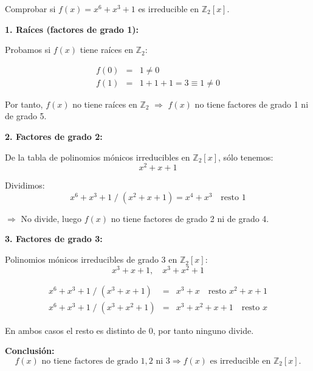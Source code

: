\documentclass[a4paper,12pt]{article}
\begin{document}
\begin{ejemplo}[title=Ejemplo: Polinomio Irreducible]

Comprobar si \( f(x) = x^6 + x^3 + 1 \) es irreducible en \(\mathbb{Z}_2[x]\).

\medskip
\textbf{1. Raíces (factores de grado 1):}

Probamos si \(f(x)\) tiene raíces en \(\mathbb{Z}_2\):

\[
\begin{array}{lcl}
f(0) &=& 1 \neq 0 \\
f(1) &=& 1 + 1 + 1 = 3 \equiv 1 \neq 0
\end{array}
\]

Por tanto, \(f(x)\) no tiene raíces en \(\mathbb{Z}_2\)  
\(\Rightarrow\) \(f(x)\) no tiene factores de grado 1 ni de grado 5.

\medskip
\textbf{2. Factores de grado 2:}

De la tabla de polinomios mónicos irreducibles en \(\mathbb{Z}_2[x]\), sólo tenemos:
\[
x^2 + x + 1
\]

Dividimos:
\[
x^6 + x^3 + 1 \; / \; (x^2 + x + 1) = x^4 + x^3 \quad \text{resto } \boxed{1}
\]

\(\Rightarrow\) No divide, luego \(f(x)\) no tiene factores de grado 2 ni de grado 4.

\medskip
\textbf{3. Factores de grado 3:}

Polinomios mónicos irreducibles de grado 3 en \(\mathbb{Z}_2[x]\):
\[
x^3 + x + 1, \quad x^3 + x^2 + 1
\]

\[
\begin{array}{lcl}
x^6 + x^3 + 1 \; / \; (x^3 + x + 1) &=& x^3 + x \quad \text{resto } x^2 + x + 1 \\
x^6 + x^3 + 1 \; / \; (x^3 + x^2 + 1) &=& x^3 + x^2 + x + 1 \quad \text{resto } x
\end{array}
\]

En ambos casos el resto es distinto de 0, por tanto ninguno divide.

\medskip
\textbf{Conclusión:}
\[
f(x) \text{ no tiene factores de grado } 1, 2 \text{ ni } 3 \Rightarrow \boxed{f(x) \text{ es irreducible en } \mathbb{Z}_2[x].}
\]
\end{ejemplo}
\end{document}

